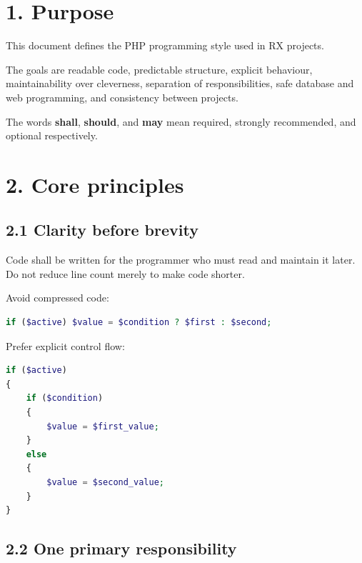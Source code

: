 \documentclass[11pt,a4paper]{article}
\begin{document}

\tableofcontents
\clearpage

\section{1. Purpose}\label{1-purpose}

This document defines the PHP programming style used in RX projects.

The goals are readable code, predictable structure, explicit behaviour,
maintainability over cleverness, separation of responsibilities, safe
database and web programming, and consistency between projects.

The words \textbf{shall}, \textbf{should}, and \textbf{may} mean
required, strongly recommended, and optional respectively.

\section{2. Core principles}\label{2-core-principles}

\subsection{2.1 Clarity before brevity}\label{21-clarity-before-brevity}

Code shall be written for the programmer who must read and maintain it
later. Do not reduce line count merely to make code shorter.

Avoid compressed code:

\begin{lstlisting}[language=PHP]
if ($active) $value = $condition ? $first : $second;
\end{lstlisting}

Prefer explicit control flow:

\begin{lstlisting}[language=PHP]
if ($active)
{
    if ($condition)
    {
        $value = $first_value;
    }
    else
    {
        $value = $second_value;
    }
}
\end{lstlisting}

\subsection{2.2 One primary
responsibility}\label{22-one-primary-responsibility}
\end{document}
